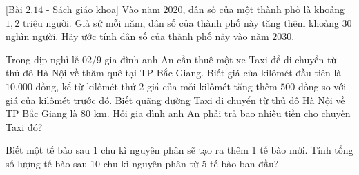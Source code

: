 \begin{bt}%
[Bài $2.14$ - Sách giáo khoa]%
	Vào năm $2020$, dân số của một thành phố là khoảng $1{,}2$ triệu người. Giả sử mỗi năm, dân số của thành phố này tăng thêm khoảng $30$ nghìn người. Hãy ước tính dân số của thành phố này vào năm $2030$.
\end{bt}

\begin{bt}%

Trong dịp nghỉ lễ 02/9 gia đình anh An cần thuê một xe Taxi để di chuyển từ thủ đô Hà Nội về thăm quê tại TP Bắc Giang. Biết giá của kilômét đầu tiên là $10.000$ đồng, kể từ kilômét thứ 2 giá của mỗi kilômét tăng thêm $500$ đồng so với giá của kilômét trước đó. Biết quãng đường Taxi di chuyển từ thủ đô Hà Nội về TP Bắc Giang là $80$ km. Hỏi gia đình anh An phải trả bao nhiêu tiền cho chuyến Taxi đó?
\end{bt}

\begin{bt}%

Biết một tế bào sau $1$ chu kì nguyên phân sẽ tạo ra thêm 1 tế bào mới. Tính tổng số lượng tế bào sau 10 chu kì nguyên phân từ 5 tế bào ban đầu?
\end{bt}

